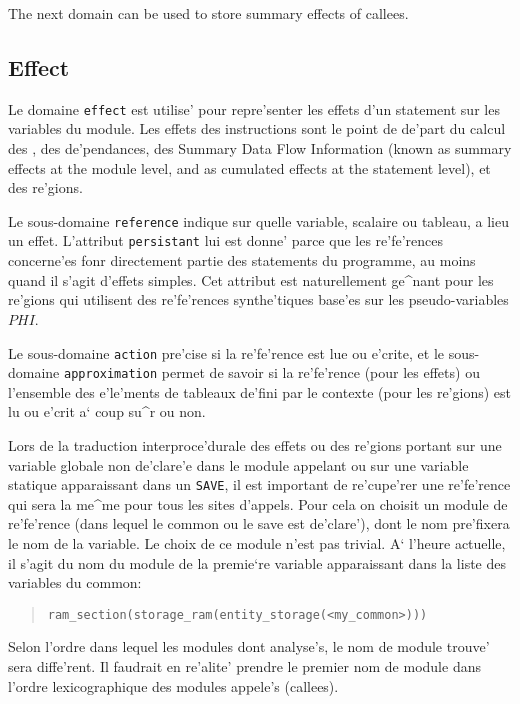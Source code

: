 {

The next domain can be used to store summary effects of callees.

{}

\subsection{Effect}
\label{subsection-effect}

{}

Le domaine \verb/effect/ est utilise' pour repre'senter les effets d'un
statement sur les variables du module. Les effets des instructions sont
le point de de'part du calcul des  , des
de'pendances, des Summary Data Flow Information (known as summary
effects at the module level, and as cumulated effects at the statement
level), et des re'gions.

Le sous-domaine {\tt reference} indique sur quelle variable, scalaire ou
tableau, a lieu un effet. L'attribut {\tt persistant} lui est donne'
parce que les re'fe'rences concerne'es fonr directement partie des
statements du programme, au moins quand il s'agit d'effets simples. Cet
attribut est naturellement ge^nant pour les re'gions qui utilisent des
re'fe'rences synthe'tiques base'es sur les pseudo-variables $PHI$.

Le sous-domaine {\tt action} pre'cise si la
re'fe'rence est lue ou e'crite, et le sous-domaine {\tt approximation}
permet de savoir si la re'fe'rence (pour les effets) ou l'ensemble des
e'le'ments de tableaux de'fini par le contexte (pour les re'gions) est lu ou
e'crit a` coup su^r ou non. 

Lors de la traduction interproce'durale des effets ou des re'gions portant
sur une variable globale non de'clare'e dans le module appelant ou sur une
variable statique apparaissant dans un {\tt SAVE}, il est important de
re'cupe'rer une re'fe'rence qui sera la me^me pour tous les sites d'appels.
Pour cela on choisit un module de re'fe'rence (dans lequel le common ou le
save est de'clare'), dont le nom pre'fixera le nom de la variable. Le choix
de ce module n'est pas trivial. A` l'heure actuelle, il s'agit du nom du
module de la premie`re variable apparaissant dans la liste des variables du
common:
\begin{quote}
 {\tt ram\_section(storage\_ram(entity\_storage(<my\_common>)))}
\end{quote}
Selon l'ordre dans lequel les modules dont analyse's, le nom de module
trouve' sera diffe'rent. Il faudrait en re'alite' prendre le premier nom
de module dans l'ordre lexicographique des modules appele's (callees).

}

